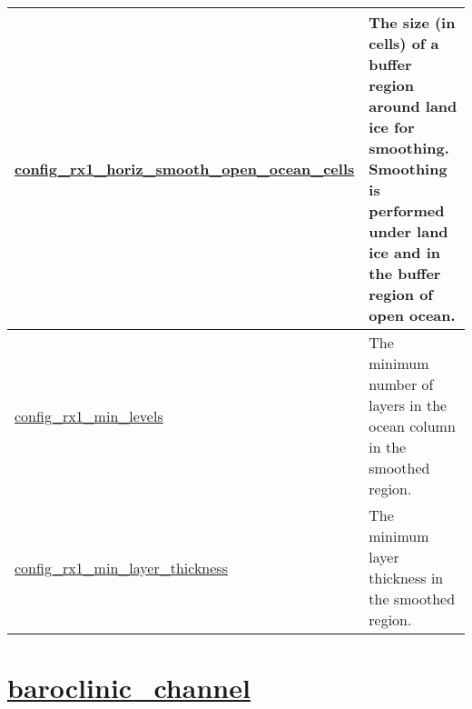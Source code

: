 {\begin{center}
\begin{longtable}{| p{2.0in} || p{4.0in} |}
    \hline
    \hyperref[subsec:nm_sec_config_rx1_horiz_smooth_open_ocean_cells]{config\_rx1\_horiz\_smooth\_\-open\_ocean\_cells} & The size (in cells) of a buffer region around land ice for smoothing.  Smoothing is performed under land ice and in the buffer region of open ocean. \\
    \hline
    \hyperref[subsec:nm_sec_config_rx1_min_levels]{config\_rx1\_min\_levels} & The minimum number of layers in the ocean column in the smoothed region. \\
    \hline
    \hyperref[subsec:nm_sec_config_rx1_min_layer_thickness]{config\_rx1\_min\_layer\_thickness} & The minimum layer thickness in the smoothed region. \\
    \hline
\end{longtable}
\end{center}
}
\section[baroclinic\_channel]{\hyperref[sec:nm_sec_baroclinic_channel]{baroclinic\_channel}}
\label{sec:nm_tab_baroclinic_channel}
\vspace{0.5in}
